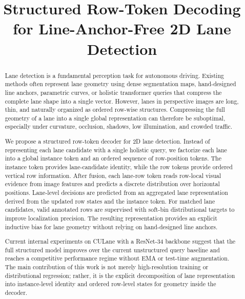 \documentclass[conference]{IEEEtran}
\begin{document}
\title{Structured Row-Token Decoding for Line-Anchor-Free 2D Lane Detection}

\author{
}

\maketitle

\begin{abstract}
Lane detection is a fundamental perception task for autonomous driving. Existing methods often represent lane geometry using dense segmentation maps, hand-designed line anchors, parametric curves, or holistic transformer queries that compress the complete lane shape into a single vector. However, lanes in perspective images are long, thin, and naturally organized as ordered row-wise structures. Compressing the full geometry of a lane into a single global representation can therefore be suboptimal, especially under curvature, occlusion, shadows, low illumination, and crowded traffic.

We propose a structured row-token decoder for 2D lane detection. Instead of representing each lane candidate with a single holistic query, we factorize each lane into a global instance token and an ordered sequence of row-position tokens. The instance token provides lane-candidate identity, while the row tokens provide ordered vertical row information. After fusion, each lane-row token reads row-local visual evidence from image features and predicts a discrete distribution over horizontal positions. Lane-level decisions are predicted from an aggregated lane representation derived from the updated row states and the instance token. For matched lane candidates, valid annotated rows are supervised with soft-bin distributional targets to improve localization precision. The resulting representation provides an explicit inductive bias for lane geometry without relying on hand-designed line anchors.

Current internal experiments on CULane with a ResNet-34 backbone suggest that the full structured model improves over the current unstructured query baseline and reaches a competitive performance regime without EMA or test-time augmentation. The main contribution of this work is not merely high-resolution training or distributional regression; rather, it is the explicit decomposition of lane representation into instance-level identity and ordered row-level states for geometry inside the decoder.
\end{abstract}
\end{document}
